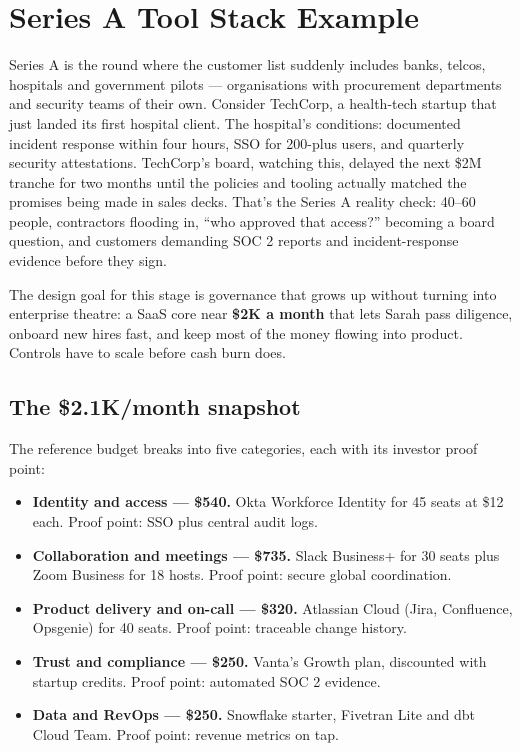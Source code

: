 \section{Series A Tool Stack Example}
Series A is the round where the customer list suddenly includes banks, telcos, hospitals and government pilots — organisations with procurement departments and security teams of their own. Consider TechCorp, a health-tech startup that just landed its first hospital client. The hospital's conditions: documented incident response within four hours, SSO for 200-plus users, and quarterly security attestations. TechCorp's board, watching this, delayed the next \$2M tranche for two months until the policies and tooling actually matched the promises being made in sales decks. That's the Series A reality check: 40–60 people, contractors flooding in, ``who approved that access?'' becoming a board question, and customers demanding SOC 2 reports and incident-response evidence before they sign.


The design goal for this stage is governance that grows up without turning into enterprise theatre: a SaaS core near \textbf{\$2K a month} that lets Sarah pass diligence, onboard new hires fast, and keep most of the money flowing into product. Controls have to scale before cash burn does.



\subsection{The \$2.1K/month snapshot}


The reference budget breaks into five categories, each with its investor proof point:


\begin{itemize}[leftmargin=*]
\item \textbf{Identity and access — \$540.} Okta Workforce Identity for 45 seats at \$12 each. Proof point: SSO plus central audit logs.
\item \textbf{Collaboration and meetings — \$735.} Slack Business+ for 30 seats plus Zoom Business for 18 hosts. Proof point: secure global coordination.
\item \textbf{Product delivery and on-call — \$320.} Atlassian Cloud (Jira, Confluence, Opsgenie) for 40 seats. Proof point: traceable change history.
\item \textbf{Trust and compliance — \$250.} Vanta's Growth plan, discounted with startup credits. Proof point: automated SOC 2 evidence.
\item \textbf{Data and RevOps — \$250.} Snowflake starter, Fivetran Lite and dbt Cloud Team. Proof point: revenue metrics on tap.
\end{itemize}


